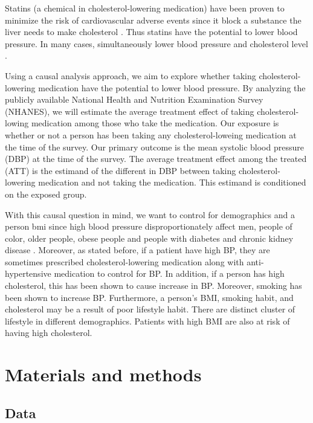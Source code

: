 \documentclass[useAMS,usenatbib,referee]{biom}
\begin{document}
Statins (a chemical in cholesterol-lowering medication) have been proven
to minimize the risk of cardiovascular adverse events since it block a
substance the liver needs to make cholesterol \citep{liu_statins_2023}.
Thus statins have the potential to lower blood pressure. In many cases,
simultaneously lower blood pressure and cholesterol level
\citep{strazzullo_statins_2007}.

Using a causal analysis approach, we aim to explore whether taking
cholesterol-lowering medication have the potential to lower blood
pressure. By analyzing the publicly available National Health and
Nutrition Examination Survey (NHANES), we will estimate the average
treatment effect of taking cholesterol-lowing medication among those who
take the medication. Our exposure is whether or not a person has been
taking any cholesterol-loweing medication at the time of the survey. Our
primary outcome is the mean systolic blood pressure (DBP) at the time of
the survey. The average treatment effect among the treated (ATT) is the
estimand of the different in DBP between taking cholesterol-lowering
medication and not taking the medication. This estimand is conditioned
on the exposed group.

With this causal question in mind, we want to control for demographics
and a person bmi since high blood pressure disproportionately affect
men, people of color, older people, obese people and people with
diabetes and chronic kidney disease \citep{chobufo_prevalence_2020}.
Moreover, as stated before, if a patient have high BP, they are
sometimes prescribed cholesterol-lowering medication along with
anti-hypertensive medication to control for BP. In addition, if a person
has high cholesterol, this has been shown to cause increase in BP.
Moreover, smoking has been shown to increase BP. Furthermore, a person's
BMI, smoking habit, and cholesterol may be a result of poor lifestyle
habit. There are distinct cluster of lifestyle in different
demographics. Patients with high BMI are also at risk of having high
cholesterol.

\hypertarget{methods}{%
\section{Materials and methods}\label{methods}}

\hypertarget{data}{%
\subsection{Data}\label{data}}
\end{document}
